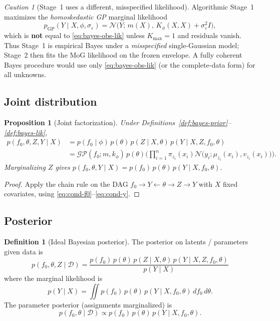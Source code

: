 \documentclass[11pt,a4paper]{article}
\theoremstyle{plain}
\newtheorem{proposition}[theorem]{Proposition}
\theoremstyle{definition}
\newtheorem{definition}[theorem]{Definition}
\theoremstyle{remark}
\newtheorem{caution}[theorem]{Caution}
\newcommand{\Ncal}{\mathcal{N}}
\newcommand{\GP}{\mathcal{GP}}
\newcommand{\D}{\mathcal{D}}
\newcommand{\tht}{\theta}
\newcommand{\Kmax}{K_{\max}}
\begin{document}
\begin{caution}[Stage~1 uses a different, misspecified likelihood]
Algorithmic Stage~1 maximizes the \emph{homoskedastic GP} marginal likelihood
\[
  p_{\mathrm{GP}}(Y\mid X,\phi,\sigma_\varepsilon)
  =
  \Ncal\!\bigl(Y;\,m(X),\,K_\phi(X,X)+\sigma_\varepsilon^2 I\bigr),
\]
which is \textbf{not} equal to \eqref{eq:bayes-obs-lik} unless \(\Kmax=1\) and
residuals vanish.
Thus Stage~1 is empirical Bayes under a \emph{misspecified} single-Gaussian model;
Stage~2 then fits the MoG likelihood on the frozen envelope.
A fully coherent Bayes procedure would use only \eqref{eq:bayes-obs-lik}
(or the complete-data form) for all unknowns.
\end{caution}

\subsection{Joint distribution}
\begin{proposition}[Joint factorization]
\label{prop:bayes-joint}
Under Definitions~\ref{def:bayes-prior}--\ref{def:bayes-lik},
\begin{equation}
  \begin{aligned}
  p(f_0,\tht,Z,Y\mid X)
  &=
  p(f_0\mid\phi)\,p(\tht)\,
  p(Z\mid X,\tht)\,
  p(Y\mid X,Z,f_0,\tht)
  \\
  &=
  \GP(f_0;m,k_\phi)\,p(\tht)
  \Biggl(
    \prod_{i=1}^n
    \pi_{z_i}(x_i)
    \Ncal\!\bigl(y_i;\mu_{z_i}(x_i),v_{z_i}(x_i)\bigr)
  \Biggr).
  \end{aligned}
  \label{eq:bayes-joint}
\end{equation}
Marginalizing \(Z\) gives
\(p(f_0,\tht,Y\mid X)=p(f_0)\,p(\tht)\,p(Y\mid X,f_0,\tht)\).
\end{proposition}

\begin{proof}
Apply the chain rule on the DAG
\(f_0\to Y\leftarrow\tht\to Z\to Y\) with \(X\) fixed covariates, using
\eqref{eq:cond-f0}--\eqref{eq:cond-y}.
\end{proof}

\subsection{Posterior}
\begin{definition}[Ideal Bayesian posterior]
\label{def:bayes-post}
The posterior on latents / parameters given data is
\begin{equation}
  \boxed{
  p(f_0,\tht,Z\mid\D)
  =
  \frac{
    p(f_0)\,p(\tht)\,p(Z\mid X,\tht)\,p(Y\mid X,Z,f_0,\tht)
  }{
    p(Y\mid X)
  }
  }
  \label{eq:bayes-post}
\end{equation}
where the marginal likelihood is
\[
  p(Y\mid X)
  =
  \iint
  p(f_0)\,p(\tht)\,p(Y\mid X,f_0,\tht)\,
  df_0\,d\tht.
\]
The parameter posterior (assignments marginalized) is
\begin{equation}
  p(f_0,\tht\mid\D)
  \propto
  p(f_0)\,p(\tht)\,p(Y\mid X,f_0,\tht).
  \label{eq:bayes-post-tht}
\end{equation}
\end{definition}
\end{document}
